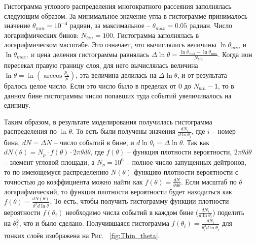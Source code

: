 \documentclass[a4paper,12pt]{article}
\begin{document}
\begin{large}
  Гистограмма углового распределения многократного рассеяния заполнялась следующим образом.
  За минимальное значение угла в гистограмме принималось значение $\theta_{min}=10^{-4}$ радиан, за максимальное -- $\theta_{max}=0.05$ радиан.
  Число логарифмических бинов: $N_{bin}=100$.
  Гистограмма заполнялась в логарифмическом масштабе.
  Это означает, что вычислялись величины $\ln{\theta_{min}}$ и $\ln{\theta_{max}}$, и цена деления гистограммы равнялась $\Delta \ln \theta=\frac{\ln{\theta_{max}}-\ln{\theta_{min}}}{N_{bin}}$. Когда ион пересекал правую границу слоя, для него вычислялась величина $\ln{\theta}=\ln{\left( \arccos{\frac{p_x}{p}} \right)}$, эта величина делилась на $\Delta \ln{\theta}$, и от результата бралось целое число.
  Если это число было в пределах от 0 до $N_{bin}-1$, то в данном бине гистограммы число попавших туда событий увеличивалось на единицу.

  Таким образом, в результате моделирования получилась гистограмма распределения по $\ln{\theta}$.
  То есть были получены значения $\frac{dN_i}{d\ln{\theta_i}}$, где $i$ -- номер бина, $dN=\Delta N$ -- число событий в бине, и $d\ln{\theta_i}=\Delta\ln{\theta}$. 
  Так как $dN(\theta)=N_p\cdot f(\theta)\cdot 2\pi \theta d\theta$, где $f(\theta)$ -- функция плотности вероятности, $2\pi \theta d\theta$ -- элемент угловой площади, а $N_p=10^6$ -- полное число запущенных дейтронов, то по имеющемуся распределению $N(\theta)$ функцию плотности вероятности с точностью до коэффициента можно найти как $f(\theta)=\frac{dN}{\theta d\theta}$.
  Если масштаб по $\theta$ логарифмический, то функция плотности вероятности будет находиться как $f(\theta)=\frac{dN(\theta)}{\theta^2d\ln{\theta}}$.
  То есть, чтобы получить гистограмму функции плотности вероятности $f(\theta_i)$ необходимо числа событий в каждом бине ($\frac{dN_i}{d\ln{\theta_i}}$) поделить на $\theta_i^2$, что и было сделано.
  Получившаяся гистограмма $f(\theta_i)=\frac{dN_i}{\theta_i^2d\ln{\theta_i}}$ для тонких слоёв изображена на Рис. ~\ref{fig:Thin_theta}.


\end{large}
\end{document}
